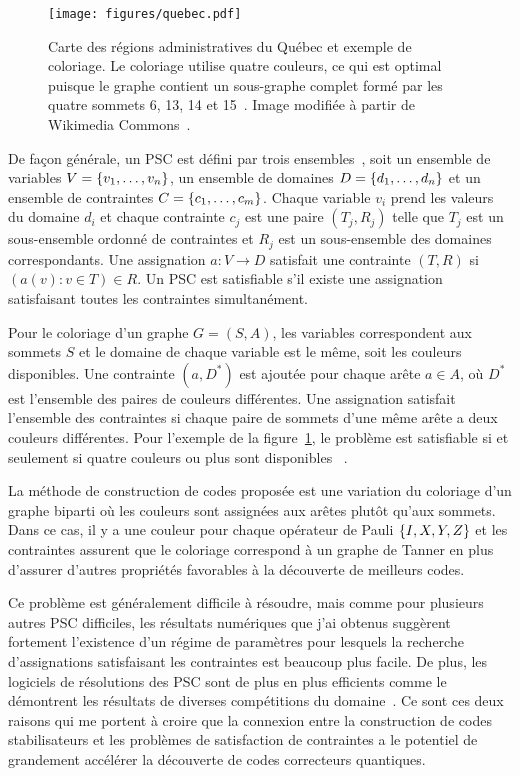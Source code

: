 \begin{figure}
  \begin{center}
    \texttt{[image: figures/quebec.pdf]}
  \end{center}
  \caption[Exemple du problème de coloriage d'une carte]{
    Carte des régions administratives du Québec et exemple de coloriage. 
    Le coloriage utilise quatre couleurs,
    ce qui est optimal puisque le graphe contient un sous-graphe complet
    formé par les quatre sommets 6, 13, 14 et 15~\cite{kubale_graph_2004}.
    Image modifiée à partir de Wikimedia Commons~\cite{noauthor_carte_2016}.
  }
  \label{fig:quebec}
\end{figure}

De façon générale,
un PSC est défini par trois ensembles~\cite{lecoutre_constraint_2009},
soit un ensemble de variables $V = \qty{v_1, \ldots, v_n}$,
un ensemble de domaines $D = \qty{d_1, \ldots, d_n}$
et un ensemble de contraintes $C = \qty{c_1, \ldots, c_m}$.
Chaque variable $v_i$ prend les valeurs du domaine $d_i$
et chaque contrainte $c_j$ est une paire $(T_j, R_j)$
telle que $T_j$ est un sous-ensemble ordonné de contraintes et $R_j$
est un sous-ensemble des domaines correspondants.
Une assignation $a: V \to D$ satisfait une contrainte $(T, R)$ 
si $(a(v) : v \in T) \in R$.
Un PSC est satisfiable s'il existe une assignation 
satisfaisant toutes les contraintes simultanément.

Pour le coloriage d'un graphe $G = (S, A)$,
les variables correspondent aux sommets $S$
et le domaine de chaque variable est le même,
soit les couleurs disponibles.
Une contrainte $(a, D^*)$ est ajoutée pour chaque arête $a \in A$,
où $D^*$ est l'ensemble des paires de couleurs différentes.
Une assignation satisfait l'ensemble des contraintes 
si chaque paire de sommets d'une même arête a deux couleurs différentes.
Pour l'exemple de la figure~\ref{fig:quebec},
le problème est satisfiable si et seulement si quatre couleurs 
ou plus sont disponibles ~\cite{kubale_graph_2004}.

La méthode de construction de codes proposée est une variation 
du coloriage d'un graphe biparti où les couleurs sont assignées aux arêtes plutôt qu'aux sommets.
Dans ce cas, il y a une couleur pour chaque opérateur de Pauli $\qty{I, X, Y, Z}$
et les contraintes assurent que le coloriage correspond à un graphe de Tanner
en plus d'assurer d'autres propriétés favorables à la découverte de meilleurs codes.

Ce problème est généralement difficile à résoudre,
mais comme pour plusieurs autres PSC difficiles,
les résultats numériques que j'ai obtenus suggèrent fortement
l'existence d'un régime de paramètres pour lesquels la recherche d'assignations
satisfaisant les contraintes est beaucoup plus facile.
De plus,
les logiciels de résolutions des PSC sont de plus en plus efficients comme le démontrent les résultats
de diverses compétitions du domaine~\cite{noauthor_minizinc_nodate, noauthor_sat_nodate}.
Ce sont ces deux raisons qui me portent à croire que la connexion entre la construction de 
codes stabilisateurs et les problèmes de satisfaction de contraintes a le potentiel de grandement accélérer la découverte de codes correcteurs quantiques.

